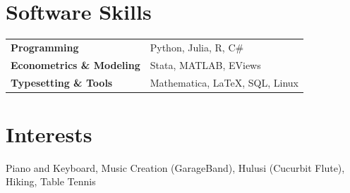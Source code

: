 \documentclass[a4paper,12pt]{article}
\begin{document}
\section{Software Skills}
\begin{tabularx}{\linewidth}{@{}l X@{}}
\textbf{Programming}  &  \hfill \normalsize{Python, Julia, R, C\#}\\ 
\textbf{Econometrics \& Modeling}  & \hfill \normalsize{Stata, MATLAB, EViews}\\ 
\textbf{Typesetting \& Tools}  & \hfill \normalsize{Mathematica, \LaTeX, SQL, Linux}
\end{tabularx} %




\section{Interests}

Piano and Keyboard, Music Creation (GarageBand), Hulusi (Cucurbit Flute), Hiking, Table Tennis




\end{document}
